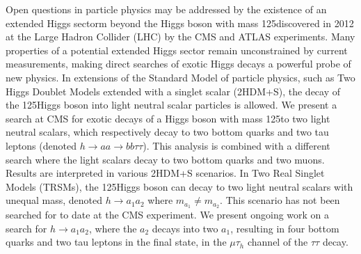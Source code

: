 Open questions in particle physics may be addressed by the existence of an extended Higgs sectorm beyond the Higgs boson with mass 125\GeV discovered in 2012 at the Large Hadron Collider (LHC) by the CMS and ATLAS experiments. Many properties of a potential extended Higgs sector remain unconstrained by current measurements, making direct searches of exotic Higgs decays a powerful probe of new physics. In extensions of the Standard Model of particle physics, such as Two Higgs Doublet Models extended with a singlet scalar (2HDM+S), the decay of the 125\GeV Higgs boson into light neutral scalar particles is allowed. We present a search at CMS for exotic decays of a Higgs boson with mass 125\GeV to two light neutral scalars, which respectively decay to two bottom quarks and two tau leptons (denoted $h\rightarrow aa \rightarrow bb\tau\tau$). This analysis is combined with a different search where the light scalars decay to two bottom quarks and two muons. Results are interpreted in various 2HDM+S scenarios. In Two Real Singlet Models (TRSMs), the 125\GeV Higgs boson can decay to two light neutral scalars with unequal mass, denoted $h \rightarrow a_1 a_2$ where $m_{a_1} \neq m_{a_2}$. This scenario has not been searched for to date at the CMS experiment. We present ongoing work on a search for $h\rightarrow a_1 a_2$, where the $a_2$ decays into two $a_1$, resulting in four bottom quarks and two tau leptons in the final state, in the $\mu\tau_{h}$ channel of the $\tau\tau$ decay. 